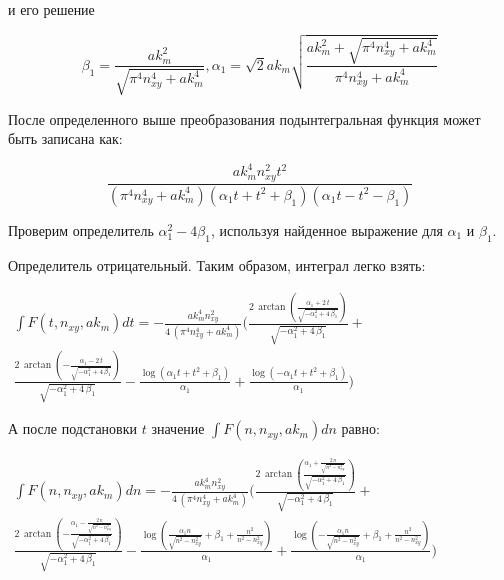 \documentclass[11pt]{article}
\begin{document}
и его решение

\[\beta_{1} = \frac{\mathit{ak}_{m}^{2}}{\sqrt{\pi^{4} n_{\mathit{xy}}^{4} + \mathit{ak}_{m}^{4}}}, \alpha_{1} = \sqrt{2} \mathit{ak}_{m} \sqrt{\frac{\mathit{ak}_{m}^{2} + \sqrt{\pi^{4} n_{\mathit{xy}}^{4} + \mathit{ak}_{m}^{4}}}{\pi^{4} n_{\mathit{xy}}^{4} + \mathit{ak}_{m}^{4}}}\]

    После определенного выше преобразования подынтегральная функция может
быть записана как:

    \[\frac{\mathit{ak}_{m}^{4} n_{\mathit{xy}}^{2} t^{2}}{{\left(\pi^{4} n_{\mathit{xy}}^{4} + \mathit{ak}_{m}^{4}\right)} {\left(\alpha_{1} t + t^{2} + \beta_{1}\right)} {\left(\alpha_{1} t - t^{2} - \beta_{1}\right)}}\]

    Проверим определитель \(\alpha_1^2 - 4\beta_1\), используя найденное
выражение для \(\alpha_1\) и \(\beta_1\).

    Определитель отрицательный. Таким образом, интеграл легко взять:

    \(\begin{array}{r} \int F\left(t, n_{xy}, ak_m\right) dt = -\frac{\mathit{ak}_{m}^{4} n_{\mathit{xy}}^{2}}{4 \, {\left(\pi^{4} n_{\mathit{xy}}^{4} + \mathit{ak}_{m}^{4}\right)}} \Bigg(\frac{2 \, \arctan\left(\frac{\alpha_{1} + 2 \, t}{\sqrt{-\alpha_{1}^{2} + 4 \, \beta_{1}}}\right)}{\sqrt{-\alpha_{1}^{2} + 4 \, \beta_{1}}} + \\ \frac{2 \, \arctan\left(-\frac{\alpha_{1} - 2 \, t}{\sqrt{-\alpha_{1}^{2} + 4 \, \beta_{1}}}\right)}{\sqrt{-\alpha_{1}^{2} + 4 \, \beta_{1}}} - \frac{\log\left(\alpha_{1} t + t^{2} + \beta_{1}\right)}{\alpha_{1}} + \frac{\log\left(-\alpha_{1} t + t^{2} + \beta_{1}\right)}{\alpha_{1}}\Bigg) \end{array}\)

    А после подстановки \(t\) значение
\(\int F\left(n, n_{xy}, ak_m\right) dn\) равно:

    \(\begin{array}{r} \int F\left(n, n_{xy}, ak_m\right) dn = -\frac{\mathit{ak}_{m}^{4} n_{\mathit{xy}}^{2}}{4 \, {\left(\pi^{4} n_{\mathit{xy}}^{4} + \mathit{ak}_{m}^{4}\right)}} \Bigg(\frac{2 \, \arctan\left(\frac{\alpha_{1} + \frac{2 \, n}{\sqrt{n^{2} - n_{\mathit{xy}}^{2}}}}{\sqrt{-\alpha_{1}^{2} + 4 \, \beta_{1}}}\right)}{\sqrt{-\alpha_{1}^{2} + 4 \, \beta_{1}}} + \\ \frac{2 \, \arctan\left(-\frac{\alpha_{1} - \frac{2 \, n}{\sqrt{n^{2} - n_{\mathit{xy}}^{2}}}}{\sqrt{-\alpha_{1}^{2} + 4 \, \beta_{1}}}\right)}{\sqrt{-\alpha_{1}^{2} + 4 \, \beta_{1}}} - \frac{\log\left(\frac{\alpha_{1} n}{\sqrt{n^{2} - n_{\mathit{xy}}^{2}}} + \beta_{1} + \frac{n^{2}}{n^{2} - n_{\mathit{xy}}^{2}}\right)}{\alpha_{1}} + \frac{\log\left(-\frac{\alpha_{1} n}{\sqrt{n^{2} - n_{\mathit{xy}}^{2}}} + \beta_{1} + \frac{n^{2}}{n^{2} - n_{\mathit{xy}}^{2}}\right)}{\alpha_{1}}\Bigg) \end{array}\)
\end{document}
